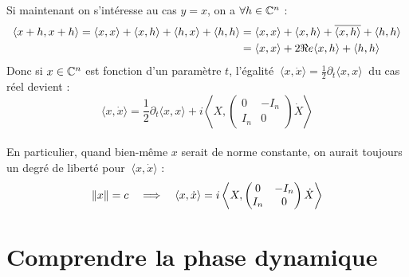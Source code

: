 Si maintenant on s'intéresse au cas $y=x$, on a $\forall h\in\mathbb{C}^n$ :
\begin{align*}
	\langle x+h, x+h \rangle = \langle x, x \rangle + \langle x, h \rangle + \langle h, x \rangle + \langle h, h \rangle 
	&= \langle x, x \rangle + \langle x, h \rangle  + \overline{\langle x, h \rangle }+ \langle h, h \rangle \\
	&= \langle x, x \rangle + 2\Re e \langle x, h \rangle + \langle h, h \rangle
\end{align*}
Donc si $x\in\mathbb{C}^n$ est fonction d'un paramètre $t$, l'égalité $\ \langle x, \dot{x} \rangle = \frac{1}{2}\partial_t\langle x, x \rangle\ $ du cas réel devient :
\begin{equation}\label{eq:x_scal_dotx}
	\langle x, \dot{x} \rangle = \frac{1}{2}\partial_t\langle x, x \rangle + i\left\langle X,\begin{pmatrix} 0 & -I_n \\ I_n & 0 \end{pmatrix}\dot{X}\right\rangle
\end{equation}
\\
En particulier, quand bien-même $x$ serait de norme constante, on aurait toujours un degré de liberté pour $\ \langle x, \dot{x} \rangle$ :
\[\|x\|=c\quad \Longrightarrow\quad \langle x, \dot{x} \rangle = i\left\langle X,\begin{pmatrix} 0 & -I_n \\ I_n & 0 \end{pmatrix}\dot{X}\right\rangle\]




\section{Comprendre la phase dynamique}

